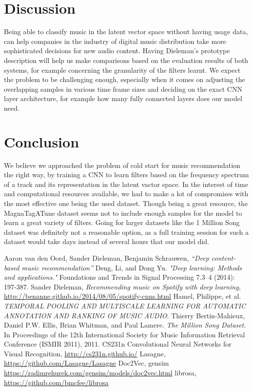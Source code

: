\documentclass[11pt, a4paper]{article}
\begin{document}
  \section{Discussion}
    Being able to classify music in the latent vector space without having
    usage data, can help companies in the industry of digital music
    distribution take more sophisticated decisions for new audio content.
    Having Dieleman's prototype description will help us make comparisons based
    on the evaluation results of both systems, for example concerning the
    granularity of the filters learnt. We expect the problem to be challenging
    enough, especially when it comes on adjusting the overlapping samples in
    various time frame sizes and deciding on the exact CNN layer architecture,
    for example how many fully connected layers does our model need.
  \section{Conclusion}
    We believe we approached the problem of cold start for music recommendation
    the right way, by training a CNN to learn filters based on the frequency
    spectrum of a track and its representation in the latent vactor space. In
    the interest of time and computational resources available, we had to make
    a lot of compromises with the most effective one being the used dataset.
    Though being a great resource, the MagnaTagATune dataset seems not to
    include enough samples for the model to learn a great variety of filters.
    Going for larger datasets like the 1 Million Song dataset was definitely
    not a reasonable option, as a full training session for such a dataset
    would take days instead of several hours that our model did.

  \begin{thebibliography}{9}
    \sf
      Aaron van den Oord, Sander Dieleman, Benjamin Schrauwen, \emph{``Deep
      content-based music recommendation''}
      Deng, Li, and Dong Yu. \emph{"Deep learning: Methods and applications."}
      Foundations and Trends in Signal Processing 7.3–4 (2014): 197-387.
      Sander Dieleman, \emph{Recommending music on Spotify with deep learning},
      \url{http://benanne.github.io/2014/08/05/spotify-cnns.html}
      Hamel, Philippe, et al. \emph{TEMPORAL POOLING AND MULTISCALE LEARNING
      FOR AUTOMATIC ANNOTATION AND RANKING OF MUSIC AUDIO}.
      Thierry Bertin-Mahieux, Daniel P.W. Ellis, Brian Whitman, and Paul
      Lamere. \emph{The Million Song Dataset}. In Proceedings of the 12th
      International Society for Music Information Retrieval Conference (ISMIR
      2011), 2011.
      CS231n Convolutional Neural Networks for Visual Recognition,
      \url{http://cs231n.github.io/}
      Lasagne, \url{https://github.com/Lasagne/Lasagne}
      Doc2Vec, gensim \url{https://radimrehurek.com/gensim/models/doc2vec.html}
      librosa, \url{https://github.com/bmcfee/librosa}
  \end{thebibliography}
\end{document}
